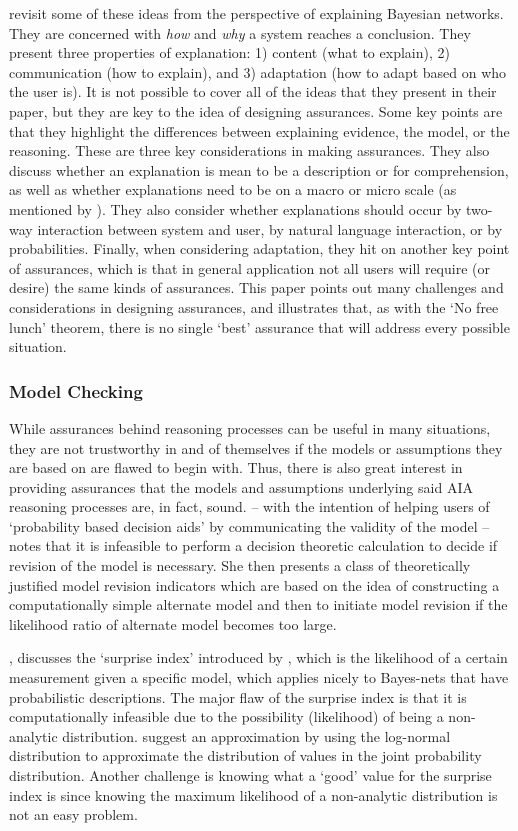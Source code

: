     \citet{Lacave2002-cu} revisit some of these ideas from the perspective of explaining Bayesian networks. They are concerned with \emph{how} and \emph{why} a system reaches a conclusion. They present three properties of explanation: 1) content (what to explain), 2) communication (how to explain), and 3) adaptation (how to adapt based on who the user is). It is not possible to cover all of the ideas that they present in their paper, but they are key to the idea of designing assurances. Some key points are that they highlight the differences between explaining evidence, the model, or the reasoning. These are three key considerations in making assurances. They also discuss whether an explanation is mean to be a description or for comprehension, as well as whether explanations need to be on a macro or micro scale (as mentioned by \citeauthor{Ruping2006-xj}). They also consider whether explanations should occur by two-way interaction between system and user, by natural language interaction, or by probabilities. Finally, when considering adaptation, they hit on another key point of assurances, which is that in general application not all users will require (or desire) the same kinds of assurances. This paper points out many challenges and considerations in designing assurances, and illustrates that, as with the `No free lunch' theorem, there is no single `best' assurance that will address every possible situation.


\subsubsection{Model Checking}
    While assurances behind reasoning processes can be useful in many situations, they are not trustworthy in and of themselves if the models or assumptions they are based on are flawed to begin with. Thus, there is also great interest in providing assurances that the models and assumptions underlying said AIA reasoning processes are, in fact, sound. \citet{Laskey1991-mf} -- with the intention of helping users of `probability based decision aids' by communicating the validity of the model -- notes that it is infeasible to perform a decision theoretic calculation to decide if revision of the model is necessary. She then presents a class of theoretically justified model revision indicators which are based on the idea of constructing a computationally simple alternate model and then to initiate model revision if the likelihood ratio of alternate model becomes too large. 

    \citet{Zagorecki2015-qy}, discusses the `surprise index' introduced by \citet{Habbema1976-xd}, which is the likelihood of a certain measurement given a specific model, which applies nicely to Bayes-nets that have probabilistic descriptions. The major flaw of the surprise index is that it is computationally infeasible due to the possibility (likelihood) of being a non-analytic distribution. \citeauthor{Zagorecki2015-qy} suggest an approximation by using the log-normal distribution to approximate the distribution of values in the joint probability distribution. Another challenge is knowing what a `good' value for the surprise index is since knowing the maximum likelihood of a non-analytic distribution is not an easy problem.

